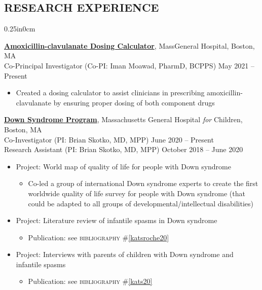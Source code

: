 \documentclass[11pt]{article}
\newcommand{\mysec}[1]{\subsection*{\uppercase{#1}}}
\newcommand{\blockindent}{0.25in}
\newcommand{\job}[4]{
\textbf{#1}, {#2} \\
{#3} \hfill {#4}\\
}
\newcommand{\jobtitle}[2]{
{#1} \hfill {#2}\\
}
\begin{document}

\mysec{Research Experience}
\begin{adjustwidth}{\blockindent}{0cm}

\job{\href{https://www.amoxclavdosing.com/}{Amoxicillin-clavulanate Dosing Calculator}}{MassGeneral Hospital, Boston, MA}{Co-Principal Investigator (Co-PI: Iman Moawad, PharmD, BCPPS)}{May 2021 -- Present}
\begin{itemize}

	\item Created a dosing calculator to assist clinicians in prescribing amoxicillin-clavulanate by ensuring proper dosing of both component drugs

\end{itemize}

\newpage
\job{\href{https://www.massgeneral.org/children/services/treatmentprograms.aspx?id=1701}{Down Syndrome Program}}{Massachusetts General Hospital \textit{for} Children, Boston, MA}{Co-Investigator (PI: Brian Skotko, MD, MPP)}{June 2020 -- Present}
\jobtitle{Research Assistant (PI: Brian Skotko, MD, MPP)}{October 2018 -- June 2020}
\begin{itemize}

	\item Project: World map of quality of life for people with Down syndrome
	\begin{itemize}
		\vspace{-3pt}
		\item Co-led a group of international Down syndrome experts to create the first worldwide quality of life survey for people with Down syndrome (that could be adapted to all groups of developmental/intellectual disabilities)
	\end{itemize}

	\vspace{3pt}
	\item Project: Literature review of infantile spasms in Down syndrome
	\begin{itemize}
		\vspace{-3pt}
		\item Publication: see \textsc{bibliography} \#\ref{katsroche20}
	\end{itemize}

	\vspace{3pt}
	\item Project: Interviews with parents of children with Down syndrome and infantile spasms
	\begin{itemize}
		\vspace{-3pt}
		\item Publication: see \textsc{bibliography} \#\ref{kats20}
	\end{itemize}


\end{itemize}
\end{adjustwidth}
\end{document}
